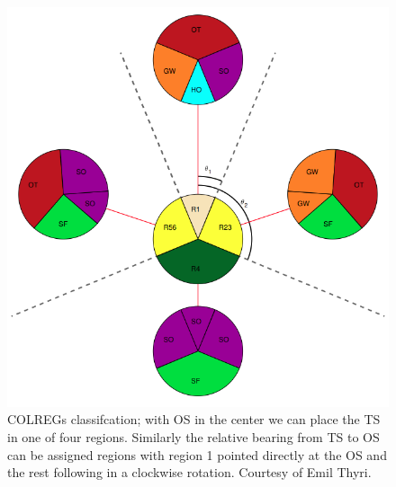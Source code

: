 \begin{figure}[t]
    \centering
    \includegraphics[height=0.6\textheight]{Images/COLREGs_assess.png}
    \caption{COLREGs classifcation; with OS in the center we can place the TS in one of four regions. Similarly the relative bearing from TS to OS can be assigned regions with region 1 pointed directly at the OS and the rest following in a clockwise rotation.
    Courtesy of Emil Thyri.}
    \label{FIG: COLREGs Classification}
\end{figure}

